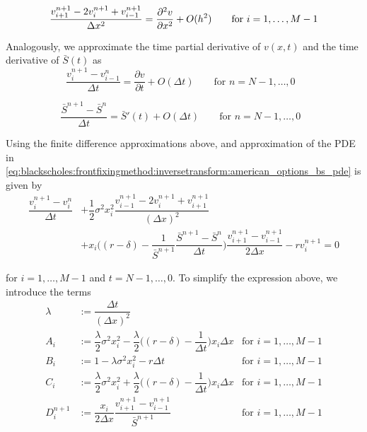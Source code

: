 \begin{equation}
  \dfrac{v^{n+1}_{i+1} - 2v^{n+1}_{i} + v^{n+1}_{i-1}}{\Delta{x}^2} = \dfrac{\partial^2{v}}{\partial{x^2}}+ O(h^2) \qquad \text{for $i = 1, \dots, M - 1$} \\
\end{equation}

Analogously, we approximate the time partial derivative of $v(x, t)$ and the time derivative of $\bar{S}(t)$
as
\begin{equation}
  \dfrac{v^{n+1}_{i} - v^{n}_{i-1}}{\Delta{t}} = \dfrac{\partial{v}}{\partial{t}}+ O(\Delta{t}) \qquad \text{for $n = N-1,\dots,0$ }
\end{equation}

\begin{equation}
  \dfrac{\bar{S}^{n+1}-\bar{S}^{n}}{\Delta t} = \bar{S}'(t) + O(\Delta{t}) \qquad \text{for $n = N-1,\dots,0$ }
\end{equation}

Using the finite difference approximations above, and approximation of the PDE in \eqref{eq:blackscholes:frontfixingmethod:inversetransform:american_options_bs_pde} 
is given by 
\begin{equation*}
  \begin{split}
    \dfrac{v^{n+1}_{i} - v^{n}_{i}}{\Delta{t}} & + \dfrac{1}{2}\sigma^2 x_i^2 \dfrac{v^{n+1}_{i-1} - 2v^{n+1}_{i} + v^{n+1}_{i+1}}{(\Delta{x})^2} \\ 
     & + x_i\bigg( (r-\delta) - \dfrac{1}{\bar{S}^{n+1}}\dfrac{\bar{S}^{n+1} - \bar{S}^{n}}{\Delta{t}} \bigg)\dfrac{v^{n+1}_{i+1} - v^{n+1}_{i-1}}{2\Delta{x}} - rv^{n+1}_{i} = 0
  \end{split}
\end{equation*}

for $i = 1, \dots, M-1$ and $t = N-1, \dots, 0$. To simplify the expression above, we introduce the terms
\begin{align*}
  \lambda &:= \dfrac{\Delta{t}}{(\Delta{x})^2} \\
  A_i &:= \dfrac{\lambda}{2}\sigma^2x^{2}_i - \dfrac{\lambda}{2}\bigg((r-\delta) - \dfrac{1}{\Delta{t}}\bigg)x_i\Delta{x} & \text{for $i = 1, \dots, M - 1$} \\ 
  B_i &:= 1 - \lambda\sigma^2x_i^2 - r\Delta{t} & \text{for $i = 1, \dots, M - 1$} \\
  C_i &:= \dfrac{\lambda}{2}\sigma^2x^{2}_i + \dfrac{\lambda}{2}\bigg((r-\delta) - \dfrac{1}{\Delta{t}}\bigg)x_i\Delta{x} &  \text{for $i = 1, \dots, M - 1$} \\
  D^{n+1}_{i} &:= \dfrac{x_i}{2\Delta{x}}\dfrac{v^{n+1}_{i+1} - v^{n+1}_{i-1}}{\bar{S}^{n+1}} &  \text{for $i = 1, \dots, M - 1$}
\end{align*}

